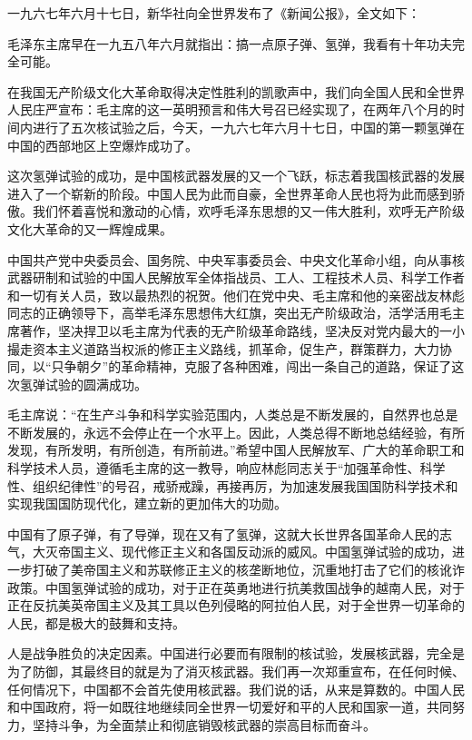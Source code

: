 \begin{maonote}
一九六七年六月十七日，新华社向全世界发布了《新闻公报》，全文如下：

毛泽东主席早在一九五八年六月就指出：搞一点原子弹、氢弹，我看有十年功夫完全可能。

在我国无产阶级文化大革命取得决定性胜利的凯歌声中，我们向全国人民和全世界人民庄严宣布：毛主席的这一英明预言和伟大号召已经实现了，在两年八个月的时间内进行了五次核试验之后，今天，一九六七年六月十七日，中国的第一颗氢弹在中国的西部地区上空爆炸成功了。

这次氢弹试验的成功，是中国核武器发展的又一个飞跃，标志着我国核武器的发展进入了一个崭新的阶段。中国人民为此而自豪，全世界革命人民也将为此而感到骄傲。我们怀着喜悦和激动的心情，欢呼毛泽东思想的又一伟大胜利，欢呼无产阶级文化大革命的又一辉煌成果。

中国共产党中央委员会、国务院、中央军事委员会、中央文化革命小组，向从事核武器研制和试验的中国人民解放军全体指战员、工人、工程技术人员、科学工作者和一切有关人员，致以最热烈的祝贺。他们在党中央、毛主席和他的亲密战友林彪同志的正确领导下，高举毛泽东思想伟大红旗，突出无产阶级政治，活学活用毛主席著作，坚决捍卫以毛主席为代表的无产阶级革命路线，坚决反对党内最大的一小撮走资本主义道路当权派的修正主义路线，抓革命，促生产，群策群力，大力协同，以“只争朝夕”的革命精神，克服了各种困难，闯出一条自己的道路，保证了这次氢弹试验的圆满成功。

毛主席说：“在生产斗争和科学实验范围内，人类总是不断发展的，自然界也总是不断发展的，永远不会停止在一个水平上。因此，人类总得不断地总结经验，有所发现，有所发明，有所创造，有所前进。”希望中国人民解放军、广大的革命职工和科学技术人员，遵循毛主席的这一教导，响应林彪同志关于“加强革命性、科学性、组织纪律性”的号召，戒骄戒躁，再接再厉，为加速发展我国国防科学技术和实现我国国防现代化，建立新的更加伟大的功勋。

中国有了原子弹，有了导弹，现在又有了氢弹，这就大长世界各国革命人民的志气，大灭帝国主义、现代修正主义和各国反动派的威风。中国氢弹试验的成功，进一步打破了美帝国主义和苏联修正主义的核垄断地位，沉重地打击了它们的核讹诈政策。中国氢弹试验的成功，对于正在英勇地进行抗美救国战争的越南人民，对于正在反抗美英帝国主义及其工具以色列侵略的阿拉伯人民，对于全世界一切革命的人民，都是极大的鼓舞和支持。

人是战争胜负的决定因素。中国进行必要而有限制的核试验，发展核武器，完全是为了防御，其最终目的就是为了消灭核武器。我们再一次郑重宣布，在任何时候、任何情况下，中国都不会首先使用核武器。我们说的话，从来是算数的。中国人民和中国政府，将一如既往地继续同全世界一切爱好和平的人民和国家一道，共同努力，坚持斗争，为全面禁止和彻底销毁核武器的崇高目标而奋斗。
\end{maonote}
